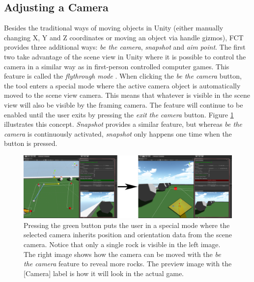 \subsection{Adjusting a Camera}

Besides the traditional ways of moving objects in Unity (either manually changing X, Y and Z coordinates or moving an object via handle gizmos), FCT provides three additional ways: \textit{be the camera}, \textit{snapshot} and \textit{aim point}. The first two take advantage of the scene view in Unity where it is possible to control the camera in a similar way as in first-person controlled computer games. This feature is called the \textit{flythrough mode} \cite{unity_flyMode}. When clicking the \textit{be the camera} button, the tool enters a special mode where the active camera object is automatically moved to the scene view camera. This means that whatever is visible in the scene view will also be visible by the framing camera. The feature will continue to be enabled until the user exits by pressing the \textit{exit the camera} button. Figure \ref{fig:beTheCam} illustrates this concept. \textit{Snapshot} provides a similar feature, but whereas \textit{be the camera} is continuously activated, \textit{snapshot} only happens one time when the button is pressed.

\begin{figure}[htbp]
\centering
\includegraphics[width=1\textwidth]{Pics/beTheCam}
\caption{Pressing the green button puts the user in a special mode where the selected camera inherits position and orientation data from the scene camera. Notice that only a single rock is visible in the left image. The right image shows how the camera can be moved with the \textit{be the camera} feature to reveal more rocks. The preview image with the [Camera] label is how it will look in the actual game.}
\label{fig:beTheCam}
\end{figure}

